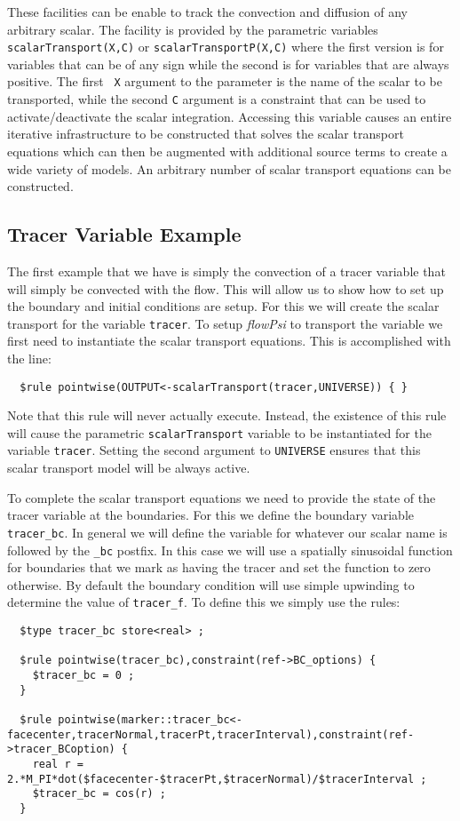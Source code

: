 \documentclass[letterpaper,twoside]{article}
\begin{document}
These facilities can be enable to track the convection and diffusion of
any arbitrary scalar.  The facility is provided by the parametric
variables {\tt scalarTransport(X,C)} or {\tt scalarTransportP(X,C)}
where the first version is for variables that can be of any sign while
the second is for variables that are always positive.  The first {\tt
  X} argument to the parameter is the name of the scalar to be
transported, while the second {\tt C} argument is a constraint that
can be used to activate/deactivate the scalar integration.  Accessing
this variable causes an entire iterative infrastructure to be
constructed that solves the scalar transport equations which can then
be augmented with additional source terms to create a wide variety of
models.  An arbitrary number of scalar transport equations can be
constructed.

\subsection{Tracer Variable Example}

The first example that we have is simply the convection of a tracer
variable that will simply be convected with the flow.  This will allow
us to show how to set up the boundary and initial conditions are
setup.  For this we will create the scalar transport for the variable
{\tt tracer}.  To setup {\it flowPsi} to transport the variable  we first need
to instantiate the scalar transport equations.  This is accomplished
with the line:
\begin{verbatim}
  $rule pointwise(OUTPUT<-scalarTransport(tracer,UNIVERSE)) { }
\end{verbatim}
Note that this rule will never actually execute.  Instead, the
existence of this rule will cause the parametric {\tt scalarTransport}
variable to be instantiated for the variable {\tt tracer}.  Setting
the second argument to {\tt UNIVERSE} ensures that this scalar
transport model will be always active.

To complete the scalar transport equations we need to provide the
state of the tracer variable at the boundaries.  For this we define
the boundary variable {\tt tracer\_bc}.  In general we will define the
variable for whatever our scalar name is followed by the {\tt \_bc}
postfix.  In this case we will use a spatially sinusoidal function for
boundaries that we mark as having the tracer and set the function to
zero otherwise.  By default the boundary condition will use simple
upwinding to determine the value of {\tt tracer\_f}.  To define this
we simply use the rules:
\begin{verbatim}
  $type tracer_bc store<real> ;
  
  $rule pointwise(tracer_bc),constraint(ref->BC_options) {
    $tracer_bc = 0 ;
  }
  
  $rule pointwise(marker::tracer_bc<-facecenter,tracerNormal,tracerPt,tracerInterval),constraint(ref->tracer_BCoption) {
    real r = 2.*M_PI*dot($facecenter-$tracerPt,$tracerNormal)/$tracerInterval ;
    $tracer_bc = cos(r) ;
  }
\end{verbatim}
\end{document}
